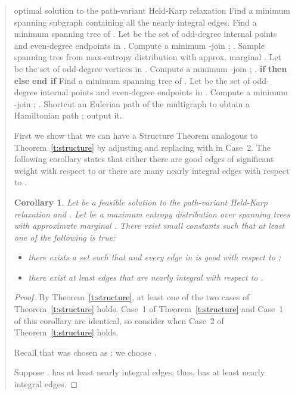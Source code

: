 \documentclass[11pt,letterpaper]{article}
\newtheorem{cor}{Corollary}
\begin{document}
\begin{quote}
\begin{algorithm}[ht]
\begin{algorithmic}[1]
	\STATE optimal solution to the path-variant Held-Karp relaxation
			\STATE Find a minimum spanning subgraph  containing all the nearly integral edges.
			\STATE Find a minimum spanning tree  of .
			\STATE Let  be the set of odd-degree internal points and even-degree endpoints in .
			\STATE Compute a minimum -join ; .
		\ELSE[Case A2]
			\STATE 
			\STATE Sample spanning tree  from max-entropy distribution with approx. marginal .
			\STATE Let  be the set of odd-degree vertices in .
			\STATE Compute a minimum -join ; .
			\STATE \textbf{if}  \textbf{then}  \textbf{else}  \textbf{end if}
		\ENDIF
	\ELSE[Case B]
		\STATE Find a minimum spanning tree  of .
		\STATE Let  be the set of odd-degree internal points and even-degree endpoints in .
		\STATE Compute a minimum -join ; .
	\ENDIF
	\STATE Shortcut an Eulerian path of the multigraph  to obtain a Hamiltonian path ; output it.
\end{algorithmic}
\end{algorithm}

First we show that we can have a Structure Theorem analogous to Theorem~\ref{t:structure} by adjusting  and replacing  with  in Case~2. The following corollary states that either there are good edges of significant weight with respect to  or there are many nearly integral edges with respect to .
\begin{cor}
\label{c:pathstructure}
Let  be a feasible solution to the path-variant Held-Karp relaxation and  . Let  be a maximum entropy distribution over spanning trees with approximate marginal . There exist small constants  such that at least one of the following is true:\begin{itemize}
\item[1.] there exists a set  such that  and every edge in  is good with respect to ;
\item[2.] there exist at least  edges that are nearly integral with respect to .
\end{itemize}
\end{cor}
\begin{proof}
By Theorem~\ref{t:structure}, at least one of the two cases of Theorem~\ref{t:structure} holds. Case~1 of Theorem~\ref{t:structure} and Case~1 of this corollary are identical, so consider when Case~2 of Theorem~\ref{t:structure} holds.

Recall that  was chosen as ; we choose .

Suppose .  has at least  nearly integral edges; thus,  has at least  nearly integral edges.


\end{proof}
\end{quote}
\end{document}
